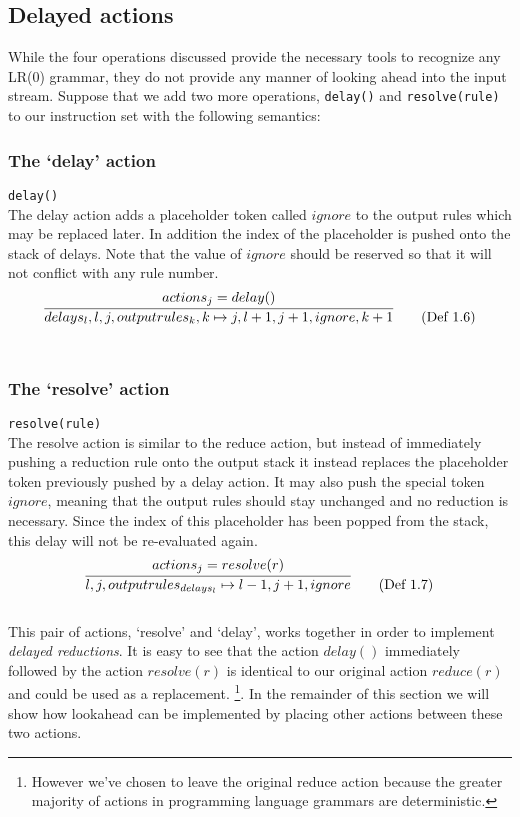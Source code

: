 \documentclass[11pt]{article}
\begin{document}
\subsection{Delayed actions}
While the four operations discussed provide the necessary tools to recognize any LR(0) grammar, they do not provide any manner of looking ahead into the input stream.
Suppose that we add two more operations, \texttt{delay()} and \texttt{resolve(rule)} to our instruction set with the following semantics:\\

\subsubsection{The `delay' action}
\texttt{delay()}\\
The delay action adds a placeholder token called $ignore$ to the output rules which may be replaced later.
In addition the index of the placeholder is pushed onto the stack of delays.
Note that the value of $ignore$ should be reserved so that it will not conflict with any rule number.
\begin{equation}
\infer{delays_l, l, j, outputrules_k, k \mapsto j, l+1, j+1, ignore, k+1}{actions_j = delay()} \tag{Def 1.6}
\end{equation}\\

\subsubsection{The `resolve' action}
\texttt{resolve(rule)}\\
The resolve action is similar to the reduce action, but instead of immediately pushing a reduction rule onto the output stack it instead replaces the placeholder token previously pushed by a delay action.
It may also push the special token $ignore$, meaning that the output rules should stay unchanged and no reduction is necessary. 
Since the index of this placeholder has been popped from the stack, this delay will not be re-evaluated again.
\begin{equation}
\infer{l, j, outputrules_{delays_l} \mapsto l-1, j+1, ignore}{actions_j = resolve(r)} \tag{Def 1.7}
\end{equation}\\

This pair of actions, `resolve' and `delay', works together in order to implement \emph{delayed reductions}. 
It is easy to see that the action $delay()$ immediately followed by the action $resolve(r)$ is identical to our original action $reduce(r)$ and could be used as a replacement.
\footnote{However we've chosen to leave the original reduce action because the greater majority of actions in programming language grammars are deterministic.}.
In the remainder of this section we will show how lookahead can be implemented by placing other actions between these two actions.
\end{document}
